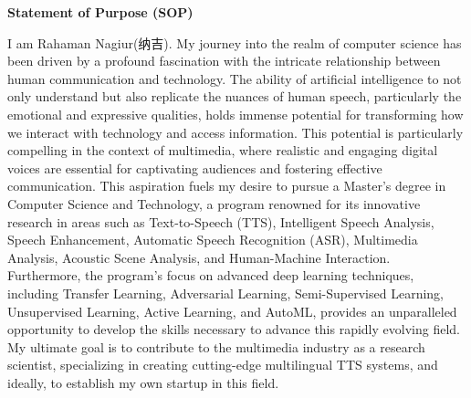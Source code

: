 \documentclass[12pt,a4paper]{article}
\newcommand{\HRule}{\rule{\linewidth}{1mm}}
\begin{document}
\begin{CJK*}{UTF8}{gbsn}
    \thispagestyle{plain}



\begin{center}

    \Huge{ \bfseries{ Statement of Purpose (SOP)}}


    \vspace*{0.2cm}


    
    


    
\end{center}


I am Rahaman Nagiur(纳吉). My journey into the realm of computer science has been driven by a profound fascination with the intricate relationship between human communication and technology. The ability of artificial intelligence to not only understand but also replicate the nuances of human speech, particularly the emotional and expressive qualities, holds immense potential for transforming how we interact with technology and access information. This potential is particularly compelling in the context of multimedia, where realistic and engaging digital voices are essential for captivating audiences and fostering effective communication. This aspiration fuels my desire to pursue a Master's degree in Computer Science and Technology, a program renowned for its innovative research in areas such as Text-to-Speech (TTS), Intelligent Speech Analysis, Speech Enhancement, Automatic Speech Recognition (ASR), Multimedia Analysis, Acoustic Scene Analysis, and Human-Machine Interaction. Furthermore, the program's focus on advanced deep learning techniques, including Transfer Learning, Adversarial Learning, Semi-Supervised Learning, Unsupervised Learning, Active Learning, and AutoML, provides an unparalleled opportunity to develop the skills necessary to advance this rapidly evolving field. My ultimate goal is to contribute to the multimedia industry as a research scientist, specializing in creating cutting-edge multilingual TTS systems, and ideally, to establish my own startup in this field.\newline


\end{CJK*}
\end{document}
